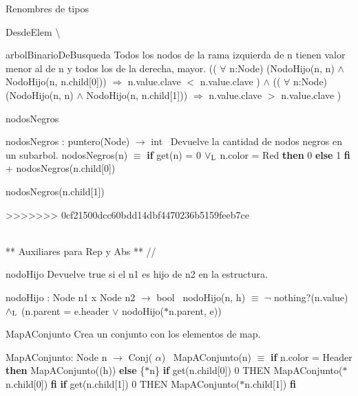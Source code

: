 \begin{DoxyParagraph}{\-Renombres de tipos}
\begin{DoxyParagraph}{\-Desde\-Elem}
\textbackslash{}

\begin{DoxyParagraph}{arbol\+Binario\+De\+Busqueda}
Todos los nodos de la rama izquierda de n tienen valor menor al de n y todos los de la derecha, mayor. (( $\forall$ n\textquotesingle{}\+:Node) (Nodo\+Hijo(n\textquotesingle{}, n) $\land$ Nodo\+Hijo(n\textquotesingle{}, n.\+child\mbox{[}0\mbox{]})) $\Rightarrow$ n\textquotesingle{}.value.\+clave $<$ n.\+value.\+clave ) $\land$ (( $\forall$ n\textquotesingle{}\+:Node) (Nodo\+Hijo(n\textquotesingle{}, n) $\land$ Nodo\+Hijo(n\textquotesingle{}, n.\+child\mbox{[}1\mbox{]})) $\Rightarrow$ n\textquotesingle{}.value.\+clave $>$ n.\+value.\+clave )
\end{DoxyParagraph}
\begin{DoxyParagraph}{nodos\+Negros}


nodos\+Negros \+: puntero(\+Node) $\to$ int~\newline
 Devuelve la cantidad de nodos negros en un subarbol. nodos\+Negros(n) $\equiv$ {\bfseries if} get(n) = 0 $\lor_{\rm L}$ n.\+color = Red {\bfseries then} 0 {\bfseries else} 1 {\bfseries fi} + nodos\+Negros(n.\+child\mbox{[}0\mbox{]})
\begin{DoxyItemize}
\item nodos\+Negros(n.\+child\mbox{[}1\mbox{]}) 
\end{DoxyItemize}
>>>>>>> 0cf21500dcc60bdd14dbf4470236b5159feeb7ce
\end{DoxyParagraph}


\begin{DoxyVerb}\\ ** Auxiliares para Rep y Abs ** //
\end{DoxyVerb}


\begin{DoxyParagraph}{nodo\+Hijo}
Devuelve true si el n1 es hijo de n2 en la estructura.

nodo\+Hijo \+: Node n1 x Node n2 $\to$ bool~\newline
 nodo\+Hijo(n, h) $\equiv$ $\lnot$ nothing?(n.\+value) $\land_{\rm L}$ (n.\+parent = e.\+header $\lor$ nodo\+Hijo($\ast$n.parent, e)) 
\end{DoxyParagraph}


\begin{DoxyParagraph}{Map\+A\+Conjunto}
Crea un conjunto con los elementos de map.

Map\+A\+Conjunto\+: Node n $\to$ Conj( $\alpha$)~\newline
 Map\+A\+Conjunto(n) $\equiv$ {\bfseries if} n.\+color = Header {\bfseries then} Map\+A\+Conjunto((h)) {\bfseries else} \{$\ast$n\}  {\bfseries if} get(n.\+child\mbox{[}0\mbox{]})  0 T\+H\+EN Map\+A\+Conjunto($\ast$n.child\mbox{[}0\mbox{]}) {\bfseries fi}  {\bfseries if} get(n.\+child\mbox{[}1\mbox{]})  0 T\+H\+EN Map\+A\+Conjunto($\ast$n.child\mbox{[}1\mbox{]}) {\bfseries fi} 



\end{DoxyParagraph}
\end{DoxyParagraph}
\end{DoxyParagraph}
